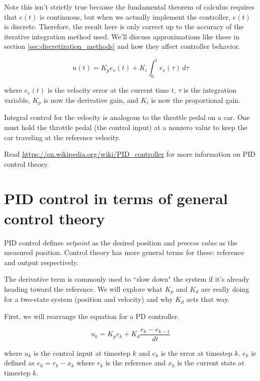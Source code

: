 Note this isn't strictly true because the fundamental theorem of calculus
requires that $e(t)$ is continuous, but when we actually implement the
controller, $e(t)$ is discrete. Therefore, the result here is only correct up to
the accuracy of the iterative integration method used. We'll discuss
approximations like these in section \ref{sec:discretization_methods} and how
they affect controller behavior.

\begin{theorem}
  \label{thm:vel_pid}

  \begin{equation}
    u(t) = K_p e_v(t) + K_i \int_0^t e_v(\tau) \,d\tau
  \end{equation}

  where $e_v(t)$ is the velocity error at the current time $t$, $\tau$ is the
  integration variable, $K_p$ is now the derivative gain, and $K_i$ is now the
  proportional gain.
\end{theorem}

Integral control for the velocity is analogous to the throttle pedal on a car.
One must hold the throttle pedal (the control input) at a nonzero value to keep
the car traveling at the reference velocity.

Read \url{https://en.wikipedia.org/wiki/PID_controller} for more information on
PID control theory.

\section{PID control in terms of general control theory}

PID control defines \textit{setpoint} as the desired position and
\textit{process value} as the measured position. Control theory has more general
terms for these: \gls{reference} and \gls{output} respectively.

The derivative term is commonly used to ``slow down" the system if it's already
heading toward the \gls{reference}. We will explore what $K_p$ and $K_d$ are
really doing for a two-state system (position and velocity) and why $K_d$ acts
that way.

First, we will rearrange the equation for a PD controller.

\begin{equation*}
  u_k = K_p e_k + K_d \frac{e_k - e_{k-1}}{dt}
\end{equation*}

where $u_k$ is the control input at timestep $k$ and $e_k$ is the error at
timestep $k$. $e_k$ is defined as $e_k = r_k - x_k$ where $r_k$ is the reference
and $x_k$ is the current state at timestep $k$.

